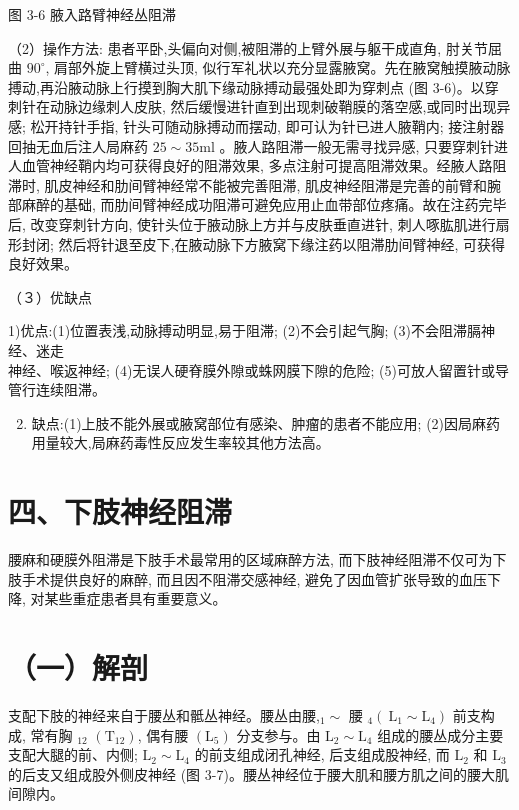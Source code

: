 \documentclass[10pt]{article}
\begin{document}
图 3-6 腋入路臂神经丛阻滞

（2）操作方法: 患者平卧,头偏向对侧,被阻滞的上臂外展与躯干成直角, 肘关节屈曲 $90^{\circ}$, 肩部外旋上臂横过头顶, 似行军礼状以充分显露腋窝。先在腋窝触摸腋动脉搏动,再沿腋动脉上行摸到胸大肌下缘动脉搏动最强处即为穿刺点 (图 3-6)。以穿刺针在动脉边缘刺人皮肤, 然后缓慢进针直到出现刺破鞘膜的落空感,或同时出现异感; 松开持针手指, 针头可随动脉搏动而摆动, 即可认为针已进人腋鞘内; 接注射器回抽无血后注人局麻药 $25 \sim 35 \mathrm{ml}$ 。腋人路阻滞一般无需寻找异感, 只要穿刺针进人血管神经鞘内均可获得良好的阻滞效果, 多点注射可提高阻滞效果。经腋人路阻滞时, 肌皮神经和肋间臂神经常不能被完善阻滞, 肌皮神经阻滞是完善的前臂和腕部麻醉的基础, 而肋间臂神经成功阻滞可避免应用止血带部位疼痛。故在注药完毕后, 改变穿刺针方向, 使针头位于腋动脉上方并与皮肤垂直进针, 刺人啄肱肌进行扇形封闭; 然后将针退至皮下,在腋动脉下方腋窝下缘注药以阻滞肋间臂神经, 可获得良好效果。

（３）优缺点

1)优点:(1)位置表浅,动脉搏动明显,易于阻滞; (2)不会引起气胸; (3)不会阻滞膈神经、迷走\\
神经、喉返神经; (4)无误人硬脊膜外隙或蛛网膜下隙的危险; (5)可放人留置针或导管行连续阻滞。

\begin{enumerate}
  \setcounter{enumi}{1}
  \item 缺点:(1)上肢不能外展或腋窝部位有感染、肿瘤的患者不能应用; (2)因局麻药用量较大,局麻药毒性反应发生率较其他方法高。
\end{enumerate}

\section*{四、下肢神经阻滞}
腰麻和硬膜外阻滞是下肢手术最常用的区域麻醉方法, 而下肢神经阻滞不仅可为下肢手术提供良好的麻醉, 而且因不阻滞交感神经, 避免了因血管扩张导致的血压下降, 对某些重症患者具有重要意义。

\section*{（一）解剖}
支配下肢的神经来自于腰丛和骶丛神经。腰丛由腰,$_{1} \sim$ 腰 $_{4}\left(\mathrm{~L}_{1} \sim \mathrm{L}_{4}\right)$ 前支构成, 常有胸 ${ }_{12}$ $\left(\mathrm{T}_{12}\right)$, 偶有腰 $\left(\mathrm{L}_{5}\right)$ 分支参与。由 $\mathrm{L}_{2} \sim \mathrm{L}_{4}$ 组成的腰丛成分主要支配大腿的前、内侧; $\mathrm{L}_{2} \sim \mathrm{L}_{4}$ 的前支组成闭孔神经, 后支组成股神经, 而 $\mathrm{L}_{2}$ 和 $\mathrm{L}_{3}$ 的后支又组成股外侧皮神经 (图 3-7)。腰丛神经位于腰大肌和腰方肌之间的腰大肌间隙内。
\end{document}
